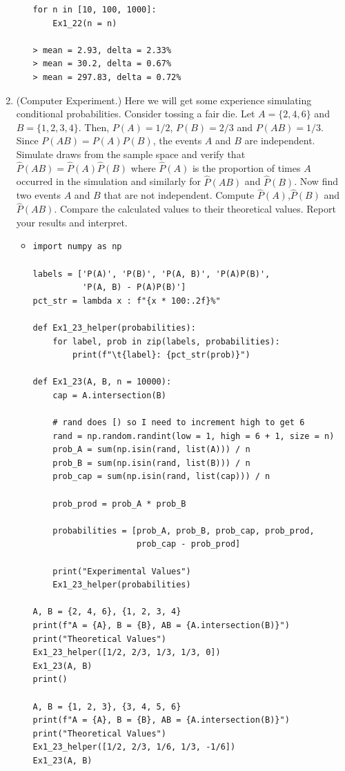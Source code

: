 \documentclass{article}
\begin{document}
\begin{enumerate}
\begin{itemize}
\begin{verbatim}
for n in [10, 100, 1000]:
    Ex1_22(n = n)

> mean = 2.93, delta = 2.33%
> mean = 30.2, delta = 0.67%
> mean = 297.83, delta = 0.72%
\end{verbatim}
		\end{itemize}
	\item (Computer Experiment.) Here we will get some experience simulating conditional probabilities. Consider tossing a fair die. Let $A = \{2, 4, 6\}$ and $B = \{1, 2, 3, 4\}$. Then, $P(A) = 1/2$, $P(B) = 2/3$ and $P(AB) = 1/3$. Since $P(AB) = P(A)P(B)$, the events $A$ and $B$ are independent. Simulate draws from the sample space and verify that $\hat{P}(AB) = \hat{P}(A)\hat{P}(B)$ where $\hat{P}(A)$ is the proportion of times $A$ occurred in the simulation and similarly for $\hat{P}(AB)$ and $\hat{P}(B)$. Now find two events $A$ and $B$ that are not independent. Compute $\hat{P}(A)$,$\hat{P}(B)$ and $\hat{P}(AB)$. Compare the calculated values to their theoretical values. Report your results and interpret.
	\begin{itemize}
		\item
\begin{verbatim}
import numpy as np

labels = ['P(A)', 'P(B)', 'P(A, B)', 'P(A)P(B)', 
          'P(A, B) - P(A)P(B)']
pct_str = lambda x : f"{x * 100:.2f}%"

def Ex1_23_helper(probabilities):
    for label, prob in zip(labels, probabilities):
        print(f"\t{label}: {pct_str(prob)}")

def Ex1_23(A, B, n = 10000):
    cap = A.intersection(B)

    # rand does [) so I need to increment high to get 6
    rand = np.random.randint(low = 1, high = 6 + 1, size = n)
    prob_A = sum(np.isin(rand, list(A))) / n
    prob_B = sum(np.isin(rand, list(B))) / n
    prob_cap = sum(np.isin(rand, list(cap))) / n

    prob_prod = prob_A * prob_B

    probabilities = [prob_A, prob_B, prob_cap, prob_prod,
                     prob_cap - prob_prod]

    print("Experimental Values")
    Ex1_23_helper(probabilities)

A, B = {2, 4, 6}, {1, 2, 3, 4}
print(f"A = {A}, B = {B}, AB = {A.intersection(B)}")
print("Theoretical Values")
Ex1_23_helper([1/2, 2/3, 1/3, 1/3, 0])
Ex1_23(A, B)
print()

A, B = {1, 2, 3}, {3, 4, 5, 6}
print(f"A = {A}, B = {B}, AB = {A.intersection(B)}")
print("Theoretical Values")
Ex1_23_helper([1/2, 2/3, 1/6, 1/3, -1/6])
Ex1_23(A, B)


\end{verbatim}
\end{itemize}
\end{enumerate}
\end{document}

